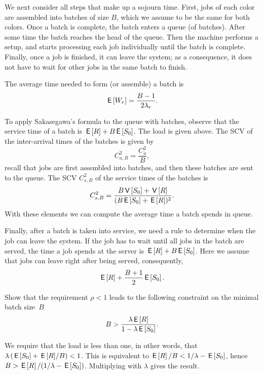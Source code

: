 We next consider all steps that make up a sojourn time.
First, jobs of each color are assembled into batches of size $B$, which we assume to be the same for both colors.
Once a batch is complete, the batch enters a queue (of batches).
After some time the batch reaches the head of the queue.
Then the machine performs a setup, and starts processing each job individually until the batch is complete.
Finally, once a job is finished, it can leave the system; as a consequence, it does not have to wait for other jobs in the same batch to finish.

The average time needed to form (or assemble) a batch is
\begin{equation}\label{eq:79}
  \,\mathsf{E}\left[W_r\right] = \frac{B-1}{2\lambda_r}.
\end{equation}

To apply Sakasegawa's formula to the queue with batches, observe that the service time of a batch is $\,\mathsf{E}\left[R\right] + B\,\mathsf{E}\left[S_0\right]$.
The load is given above.
The SCV of the inter-arrival times of the batches is given by
 \begin{equation}\label{eq:82}
C_{a,B}^2 = \frac{C_{a}^2}B,
\end{equation}
recall that jobs are first assembled into batches, and then these batches are sent to the queue.
The SCV $C_{s,B}^2$ of the service times of the batches is 
\begin{equation}\label{eq:84}
C_{s, B}^2 = \frac{B \,\mathsf{V}\left[S_0\right] + \,\mathsf{V}\left[R\right]}{(B \,\mathsf{E}\left[S_0\right] + \,\mathsf{E}\left[R\right])^2}.
\end{equation}
With these elements we can compute the average time a batch spends in queue.

Finally, after a batch is taken into service, we need a rule to determine when the job can leave the system.
If the job has to wait until all jobs in the batch are served, the time a job spends at the server is $\,\mathsf{E}\left[R\right] + B \,\mathsf{E}\left[S_0\right]$.
Here we assume that jobs can leave right after being served, consequently,
\begin{equation}\label{eq:85}
\,\mathsf{E}\left[R\right]  + \frac{B+1}{2}\,\mathsf{E}\left[S_0\right].
\end{equation}

\begin{exercise}
Show that the requirement $\rho < 1$ leads to the following constraint on the minimal batch size~$B$ 
  \begin{equation*}
 B>\frac{\lambda \,\mathsf{E}\left[R\right]}{1-\lambda \,\mathsf{E}\left[S_0\right]}.
  \end{equation*}
\begin{solution}
    We require that the load is less than one, in other words, that $\lambda\left(\,\mathsf{E}\left[S_0\right] + {\,\mathsf{E}\left[R\right]}/B\right) < 1$. This  is equivalent to $\,\mathsf{E}\left[R\right]/B < 1/\lambda - \,\mathsf{E}\left[S_0\right]$, hence $B > \,\mathsf{E}\left[R\right]/(1/\lambda - \,\mathsf{E}\left[S_0\right])$. Multiplying with $\lambda$ gives the result. 
\end{solution}
\end{exercise}

